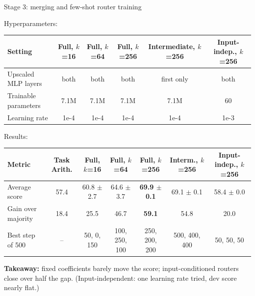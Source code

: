 \begin{frame}{Stage 3: merging and few-shot router training}
  \raggedright\small Hyperparameters:\par\vspace{.5mm}
  \centering\scriptsize
  \renewcommand{\arraystretch}{1.2}\begin{tabular}{|l|c|c|c|c|c|}
    \hline
    \textbf{Setting} & \textbf{Full, $k$=16} & \textbf{Full, $k$=64} & \textbf{Full, $k$=256} & \textbf{Intermediate, $k$=256} & \textbf{Input-indep., $k$=256}\\ \hline
    Upscaled MLP layers & both & both & both & first only & both\\ \hline
    Trainable parameters & 7.1M & 7.1M & 7.1M & 7.1M & 60\\ \hline
    Learning rate & 1e-4 & 1e-4 & 1e-4 & 1e-4 & 1e-3\\ \hline
  \end{tabular}
  \vspace{1mm}
  \raggedright\small Results:\par\vspace{.5mm}
  \centering\scriptsize
  \renewcommand{\arraystretch}{1.25}\setlength{\tabcolsep}{4pt}\begin{tabular}{|l|c|c|c|c|c|c|}
    \hline
    \textbf{Metric} & \textbf{Task Arith.} & \textbf{Full, $k$=16} & \textbf{Full, $k$=64} & \textbf{Full, $k$=256} & \textbf{Interm., $k$=256} & \textbf{Input-indep., $k$=256}\\ \hline
    Average score & 57.4 & 60.8 $\pm$ 2.7 & 64.6 $\pm$ 3.7 & \textbf{69.9 $\pm$ 0.1} & 69.1 $\pm$ 0.1 & 58.4 $\pm$ 0.0\\ \hline
    Gain over majority & 18.4 & 25.5 & 46.7 & \textbf{59.1} & 54.8 & 20.0\\ \hline
    Best step of 500 & -- & 50, 0, 150 & 100, 250, 100 & 250, 200, 200 & 500, 400, 400 & 50, 50, 50\\ \hline
  \end{tabular}
  \vfill
  \raggedright\footnotesize
  \textbf{Takeaway:} fixed coefficients barely move the score; input-conditioned routers close over half the gap. (Input-independent: one learning rate tried, dev score nearly flat.)
\end{frame}
